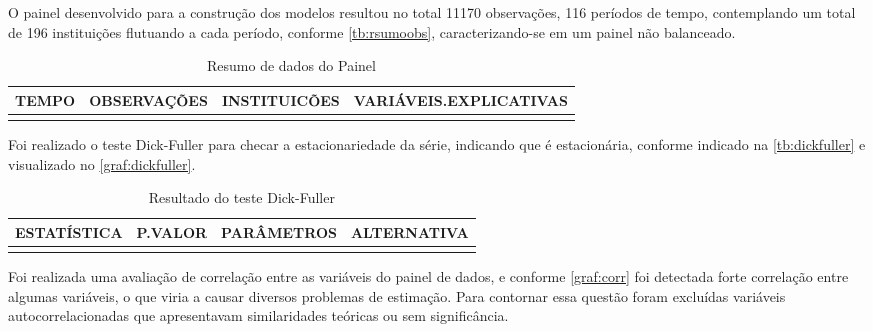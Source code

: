\documentclass[12pt,12pt,openright,oneside,a4paper,chapter=TITLE,section=TITLE,subsection=TITLE,subsubsection=TITLE,english,french,spanish,portugues,sumario=tradicional]{abntex2}
\begin{document}
O painel desenvolvido para a construção dos modelos resultou no total 11170 observações, 116 períodos de tempo, contemplando um total de 196 instituições flutuando a cada período, conforme \autoref{tb:rsumoobs}, caracterizando-se em um painel não balanceado.

\begin{table}
\caption{Resumo de dados do Painel}
\begingroup\fontsize{10}{12}\selectfont

\begin{tabu} to 
\toprule
TEMPO & OBSERVAÇÕES & INSTITUICÕES & VARIÁVEIS.EXPLICATIVAS\\
\midrule
{} &  &  & \\
\bottomrule
\end{tabu}
\endgroup{}
\label{tb:rsumoobs}
\end{table}

Foi realizado o teste Dick-Fuller para checar a estacionariedade da série, indicando que é estacionária, conforme indicado na \autoref{tb:dickfuller} e visualizado no \autoref{graf:dickfuller}.

\begin{table}
\caption{Resultado do teste Dick-Fuller}
\vspace{-2mm}
\begingroup\fontsize{10}{12}\selectfont

\begin{tabu} to 
\toprule
ESTATÍSTICA & P.VALOR & PARÂMETROS & ALTERNATIVA\\
\midrule
{} &  &  & \\
\bottomrule
\end{tabu}
\endgroup{}
\vspace{1mm}
\label{tb:dickfuller}
\vspace{-2mm}
\end{table}

Foi realizada uma avaliação de correlação entre as variáveis do painel de dados, e conforme \autoref{graf:corr} foi detectada forte correlação entre algumas variáveis, o que viria a causar diversos problemas de estimação. Para contornar essa questão foram excluídas variáveis autocorrelacionadas que apresentavam similaridades teóricas ou sem significância.
\end{document}
